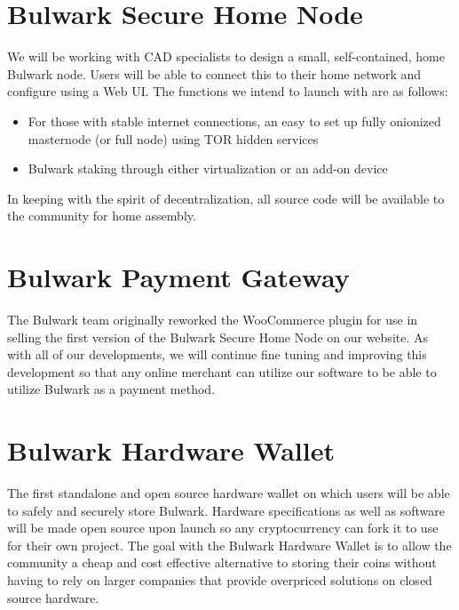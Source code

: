 \documentclass[11pt,a4paperpaper,]{report}
\providecommand{\tightlist}{%
  \setlength{\itemsep}{0pt}\setlength{\parskip}{0pt}}
\begin{document}
\section{Bulwark Secure Home Node}\label{bulwark-secure-home-node}

We will be working with CAD specialists to design a small,
self-contained, home Bulwark node. Users will be able to connect this to
their home network and configure using a Web UI. The functions we intend
to launch with are as follows:

\begin{itemize}
\tightlist
\item
  For those with stable internet connections, an easy to set up fully
  onionized masternode (or full node) using TOR hidden services
\item
  Bulwark staking through either virtualization or an add-on device
\end{itemize}

In keeping with the spirit of decentralization, all source code will be
available to the community for home assembly.

\section{Bulwark Payment Gateway}\label{bulwark-payment-gateway}

The Bulwark team originally reworked the WooCommerce plugin for use in
selling the first version of the Bulwark Secure Home Node on our
website. As with all of our developments, we will continue fine tuning
and improving this development so that any online merchant can utilize
our software to be able to utilize Bulwark as a payment method.

\section{Bulwark Hardware Wallet}\label{bulwark-hardware-wallet}

The first standalone and open source hardware wallet on which users will
be able to safely and securely store Bulwark. Hardware specifications as
well as software will be made open source upon launch so any
cryptocurrency can fork it to use for their own project. The goal with
the Bulwark Hardware Wallet is to allow the community a cheap and cost
effective alternative to storing their coins without having to rely on
larger companies that provide overpriced solutions on closed source
hardware.
\end{document}
